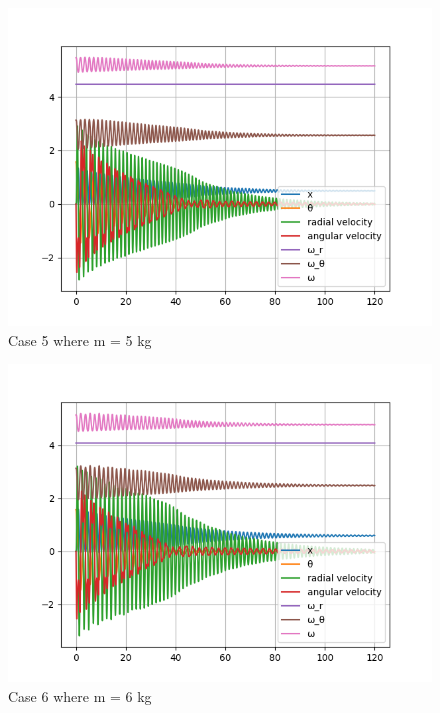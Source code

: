 \begin{figure}[H]
    \centering
    \includegraphics[width=15cm]{SimPictures/m5.png}
    \caption{{Case 5 where m = 5 kg}}
    \label{}
\end{figure}
        
\begin{figure}[H]
    \centering
    \includegraphics[width=15cm]{SimPictures/m6.png}
    \caption{{Case 6 where m = 6 kg}}
    \label{}
\end{figure}
        
